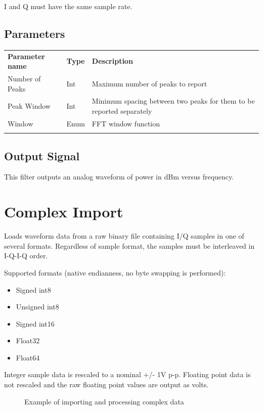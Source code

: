 I and Q must have the same sample rate.

\subsection{Parameters}

\begin{tabularx}{16cm}{llX}
\thickhline
\textbf{Parameter name} & \textbf{Type} & \textbf{Description} \\
\thickhline
Number of Peaks & Int & Maximum number of peaks to report\\
\thinhline
Peak Window & Int & Minimum spacing between two peaks for them to be reported separately\\
\thinhline
Window & Enum & FFT window function\\
\thickhline
\end{tabularx}

\subsection{Output Signal}

This filter outputs an analog waveform of power in dBm versus frequency.

\pagebreak
\section{Complex Import}

Loads waveform data from a raw binary file containing I/Q samples in one of several formats. Regardless of sample
format, the samples must be interleaved in I-Q-I-Q order.

Supported formats (native endianness, no byte swapping is performed):
\begin{itemize}
\item Signed int8
\item Unsigned int8
\item Signed int16
\item Float32
\item Float64
\end{itemize}

Integer sample data is rescaled to a nominal +/- 1V p-p. Floating point data is not rescaled and the raw floating point
values are output as volts.

\begin{figure}[h]
\centering
{}
\caption{Example of importing and processing complex data}
\label{filter_compleximport}
\end{figure}


